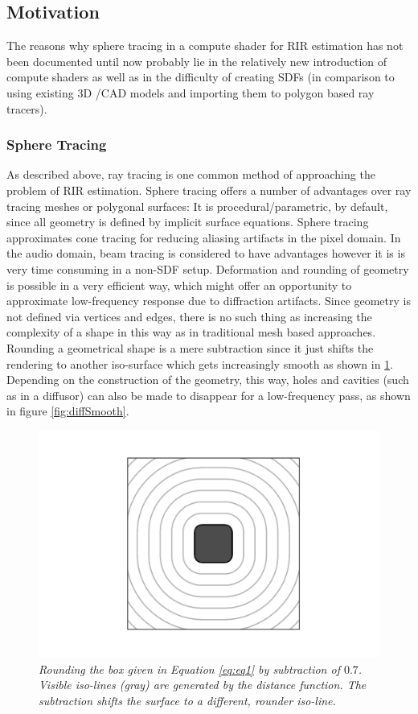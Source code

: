 \documentclass[twoside,a4paper]{article}
\begin{document}
\subsection{Motivation}
\label{subs:mot}
The reasons why sphere tracing in a compute shader for RIR estimation has not been documented until now probably lie in the relatively new introduction of compute shaders as well as in the difficulty of creating SDFs (in comparison to using existing 3D /CAD models and importing them to polygon based ray tracers).
\subsubsection{Sphere Tracing}
As described above, ray tracing is one common method of approaching the problem of RIR estimation. Sphere tracing offers a number of advantages over ray tracing meshes or polygonal surfaces: It is procedural/parametric, by default, since all geometry is defined by implicit surface equations. Sphere tracing approximates cone tracing for reducing aliasing artifacts in the pixel domain\cite{hart_sphere_1996}. In the audio domain, beam tracing is considered to have advantages however it is is very time consuming in a non-SDF setup\cite{alpkocak_computing_2010}. Deformation and rounding of geometry is possible in a very efficient way, which might offer an opportunity to approximate low-frequency response due to diffraction artifacts. Since geometry is not defined via vertices and edges, there is no such thing as increasing the complexity of a shape in this way as in traditional mesh based approaches. Rounding a geometrical shape is a mere subtraction since it just shifts the rendering to another iso-surface which gets increasingly smooth as shown in \ref{sdf_2d_box}. Depending on the construction of the geometry, this way, holes and cavities (such as in a diffusor) can also be made to disappear for a low-frequency pass, as shown in figure \ref{fig:diffSmooth}.

\begin{figure}[ht]
\centerline{\includegraphics[scale=0.6]{img/sdf2dbox.png}}
\caption{\label{sdf_2d_box}{\it Rounding the box given in Equation \ref{eq:eq1} by subtraction of $0.7$. Visible iso-lines (gray) are generated by the distance function. The subtraction shifts the surface to a different, rounder iso-line.}}
\end{figure}  
\end{document}
